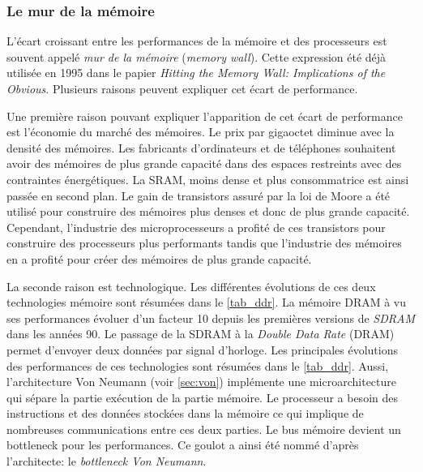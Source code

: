     \subsubsection{Le mur de la mémoire}\label{sec:memory_wall_gap}
    
        L'écart croissant entre les performances de la mémoire et des processeurs est souvent appelé \textit{mur de la mémoire} (\textit{memory wall}). Cette expression été déjà utilisée en 1995 \cite{Wulf1995} dans le papier \textit{Hitting the Memory Wall: Implications of the Obvious}. Plusieurs raisons peuvent expliquer cet écart de performance.
    
        Une première raison pouvant expliquer l'apparition de cet écart de performance est l'économie du marché des mémoires. Le prix par gigaoctet diminue avec la densité des mémoires. Les fabricants d'ordinateurs et de téléphones souhaitent avoir des mémoires de plus grande capacité dans des espaces restreints avec des contraintes énergétiques. La SRAM, moins dense et plus consommatrice est ainsi passée en second plan. Le gain de transistors assuré par la loi de Moore a été utilisé pour construire des mémoires plus denses et donc de plus grande capacité. Cependant, l’industrie des microprocesseurs a profité de ces transistors pour construire des processeurs plus performants tandis que l’industrie des mémoires en a profité pour créer des mémoires de plus grande capacité. 
            
        La seconde raison est technologique. Les différentes évolutions de ces deux technologies mémoire sont résumées dans le \autoref{tab_ddr}.  La mémoire DRAM à vu ses performances évoluer d'un facteur 10 depuis les premières versions de \textit{SDRAM} dans les années 90. Le passage de la SDRAM à la \textit{Double Data Rate} (DRAM) permet d'envoyer deux données par signal d'horloge. Les principales évolutions des performances de ces technologies sont résumées dans le \autoref{tab_ddr}. 
        Aussi, l’architecture Von Neumann (voir \autoref{sec:von}) implémente une microarchitecture qui sépare la partie exécution de la partie mémoire. Le processeur a besoin des instructions et des données stockées dans la mémoire ce qui implique de nombreuses communications entre ces deux parties. Le bus mémoire devient un \gls{bottleneck} pour les performances. Ce goulot a ainsi été nommé d'après l'architecte: le \textit{bottleneck Von Neumann}.
            
